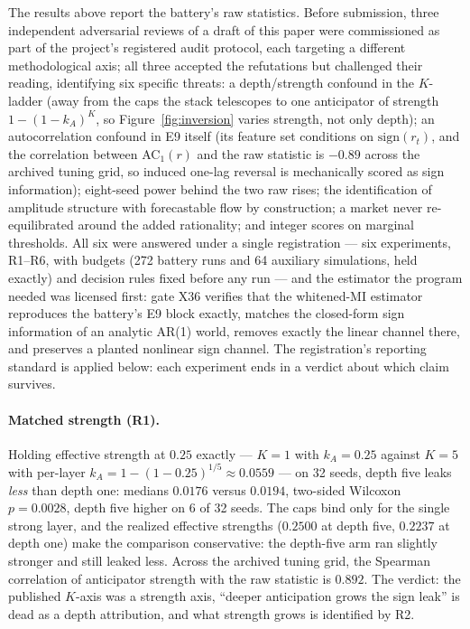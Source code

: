 \documentclass[11pt]{article}
\begin{document}
The results above report the battery's raw statistics. Before
submission, three independent adversarial reviews of a draft of this
paper were commissioned as part of the project's registered audit
protocol, each targeting a different methodological axis; all three
accepted the refutations but
challenged their reading, identifying six specific threats: a
depth/strength confound in the $K$-ladder (away from the caps the stack
telescopes to one anticipator of strength $1-(1-k_A)^K$, so
Figure~\ref{fig:inversion} varies strength, not only depth); an
autocorrelation confound in E9 itself (its feature set conditions on
$\mathrm{sign}(r_t)$, and the correlation between AC$_1(r)$ and the raw
statistic is $-0.89$ across the archived tuning grid, so induced one-lag
reversal is mechanically scored as sign information); eight-seed power
behind the two raw rises; the identification of amplitude structure with
forecastable flow by construction; a market never re-equilibrated around
the added rationality; and integer scores on marginal thresholds. All
six were answered under a single registration --- six experiments,
R1--R6, with budgets (272 battery runs and 64 auxiliary simulations,
held exactly) and decision rules fixed before any run --- and the
estimator the program needed was licensed first: gate X36 verifies that
the whitened-MI estimator reproduces the battery's E9 block exactly,
matches the closed-form sign information of an analytic AR(1) world,
removes exactly the linear channel there, and preserves a planted
nonlinear sign channel. The registration's reporting standard is applied
below: each experiment ends in a verdict about which claim survives.

\paragraph{Matched strength (R1).}
Holding effective strength at $0.25$ exactly --- $K{=}1$ with
$k_A = 0.25$ against $K{=}5$ with per-layer
$k_A = 1-(1-0.25)^{1/5} \approx 0.0559$ --- on 32 seeds, depth five
leaks \emph{less} than depth one: medians $0.0176$ versus $0.0194$,
two-sided Wilcoxon $p = 0.0028$, depth five higher on 6 of 32 seeds.
The caps bind only for the single strong layer, and the realized
effective strengths ($0.2500$ at depth five, $0.2237$ at depth one) make
the comparison conservative: the depth-five arm ran slightly stronger
and still leaked less. Across the archived tuning grid, the Spearman
correlation of anticipator strength with the raw statistic is $0.892$.
The verdict: the published $K$-axis was a strength axis, ``deeper
anticipation grows the sign leak'' is dead as a depth attribution, and
what strength grows is identified by R2.
\end{document}
